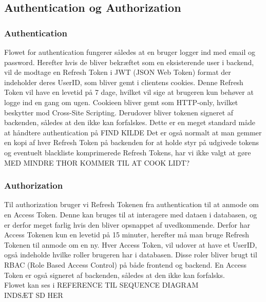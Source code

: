 \subsection{Authentication og Authorization}

\subsubsection{Authentication}
Flowet for authentication fungerer således at en bruger logger ind med email og password. Herefter hvis de bliver bekræftet som en eksisterende user i backend, vil de modtage en Refresh Token i JWT (JSON Web Token) format der indeholder deres UserID, som bliver gemt i clientens cookies.
Denne Refresh Token vil have en levetid på 7 dage, hvilket vil sige at brugeren kun behøver at logge ind en gang om ugen. Cookieen bliver gemt som HTTP-only, hvilket beskytter mod Cross-Site Scripting.
Derudover bliver tokenen signeret af backenden, således at den ikke kan forfalskes.
Dette er en meget standard måde at håndtere authentication på FIND KILDE
Det er også normalt at man gemmer en kopi af hver Refresh Token på backenden for at holde styr på udgivede tokens og eventuelt blackliste komprimerede Refresh Tokens, har vi ikke valgt at gøre MED MINDRE THOR KOMMER TIL AT COOK LIDT?
\\


\subsubsection{Authorization}
Til authorization bruger vi Refresh Tokenen fra authentication til at anmode om en Access Token. Denne kan bruges til at interagere med dataen i databasen, og er derfor meget farlig hvis den bliver opsnappet af uvedkommende.
Derfor har Access Tokenen kun en levetid på 15 minuter, herefter må man bruge Refresh Tokenen til anmode om en ny.
Hver Access Token, vil udover at have et UserID, også indeholde hvilke roller brugeren har i databasen. Disse roler bliver brugt til RBAC (Role Based Access Control) på både frontend og backend.
En Access Token er også signeret af backenden, således at den ikke kan forfalsks.
\\
Flowet kan ses i REFERENCE TIL SEQUENCE DIAGRAM
\\
INDSÆT SD HER